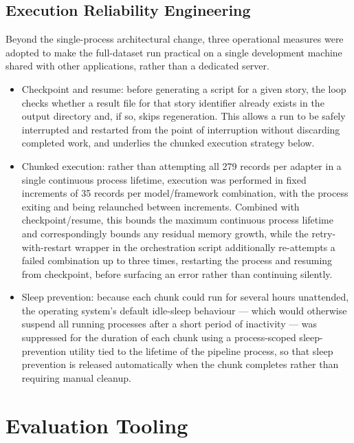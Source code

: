 \subsection{Execution Reliability Engineering}

Beyond the single-process architectural change, three operational
measures were adopted to make the full-dataset run practical on a single
development machine shared with other applications, rather than a
dedicated server.

\begin{itemize}
\item
  Checkpoint and resume: before generating a script for a given story,
  the loop checks whether a result file for that story identifier
  already exists in the output directory and, if so, skips regeneration.
  This allows a run to be safely interrupted and restarted from the
  point of interruption without discarding completed work, and underlies
  the chunked execution strategy below.
\item
  Chunked execution: rather than attempting all 279 records per adapter
  in a single continuous process lifetime, execution was performed in
  fixed increments of 35 records per model/framework combination, with
  the process exiting and being relaunched between increments. Combined
  with checkpoint/resume, this bounds the maximum continuous process
  lifetime and correspondingly bounds any residual memory growth, while
  the retry-with-restart wrapper in the orchestration script
  additionally re-attempts a failed combination up to three times,
  restarting the process and resuming from checkpoint, before surfacing
  an error rather than continuing silently.
\item
  Sleep prevention: because each chunk could run for several hours
  unattended, the operating system's default idle-sleep behaviour ---
  which would otherwise suspend all running processes after a short
  period of inactivity --- was suppressed for the duration of each chunk
  using a process-scoped sleep-prevention utility tied to the lifetime
  of the pipeline process, so that sleep prevention is released
  automatically when the chunk completes rather than requiring manual
  cleanup.
\end{itemize}

\section{Evaluation Tooling}

